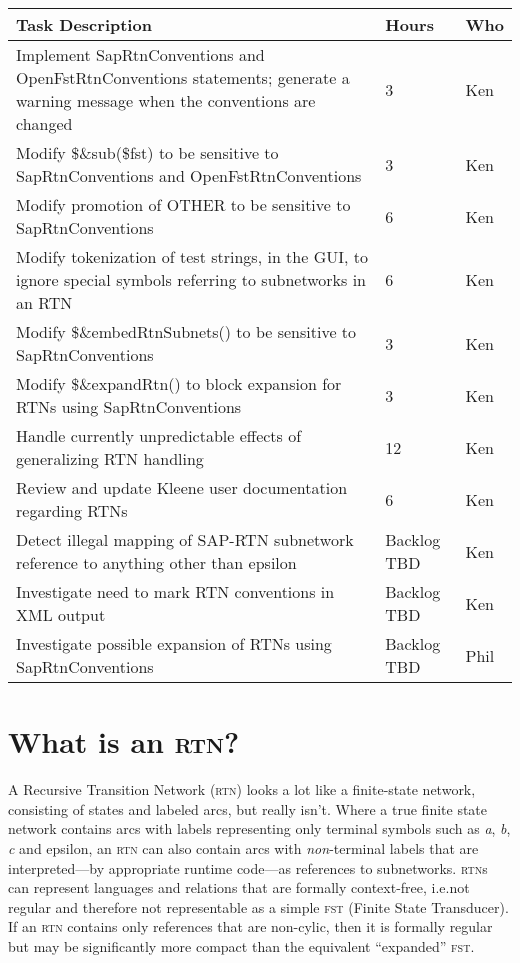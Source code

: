 \documentclass[letterpaper,12pt]{article}
\providecommand{\acro}{}\renewcommand{\acro}{\textsc}
\begin{document}
\vspace{.5cm}
\begin{tabular}{|p{9cm}|l|l|}
\hline
\textbf{Task Description} & \textbf{Hours} & Who \\
\hline
Implement SapRtnConventions and OpenFstRtnConventions statements; generate
a warning message when the conventions are changed & 3 &  Ken  \\
\hline
Modify \$\&sub(\$fst) to be sensitive to SapRtnConventions and
OpenFstRtnConventions & 3 &  Ken  \\
\hline
Modify promotion of OTHER to be sensitive to SapRtnConventions  & 6 &  Ken  \\
\hline
Modify tokenization of test strings, in the GUI, to ignore special symbols
referring to subnetworks in an RTN & 6 & Ken \\
\hline
Modify \$\&embedRtnSubnets() to be sensitive to SapRtnConventions  & 3 &  Ken  \\
\hline
Modify \$\&expandRtn() to block expansion for RTNs using
SapRtnConventions  & 3 &  Ken  \\
\hline
Handle currently unpredictable effects of generalizing RTN handling & 12 &
Ken\\
\hline
Review and update Kleene user documentation regarding RTNs & 6 & Ken\\
\hline
Detect illegal mapping of SAP-RTN subnetwork reference to anything other than
epsilon & Backlog TBD & Ken \\
\hline
Investigate need to mark RTN conventions in XML output  & Backlog TBD &  Ken  \\
\hline
Investigate possible expansion of RTNs using SapRtnConventions  & Backlog TBD &  Phil  \\
\hline
\end{tabular}
\vspace{.5cm}


\section{What is an \acro{rtn}?}

A Recursive Transition Network (\acro{rtn}) looks a lot like a finite-state network,
consisting of states and labeled arcs, but
really isn't.  Where a true finite state network contains arcs with labels
representing only terminal symbols such as \emph{a}, \emph{b}, \emph{c} and epsilon,
an \acro{rtn} can also contain arcs with
\emph{non}-terminal labels that are interpreted---by appropriate runtime code---as
references to subnetworks.  \acro{rtn}s can represent languages and relations that
are formally context-free, i.e.\@ not regular and therefore not representable as a simple
\acro{fst} (Finite State Transducer).  If an \acro{rtn} contains only references that
are non-cylic, then it is formally regular but may be significantly more compact than the
equivalent ``expanded'' \acro{fst}.
\end{document}
